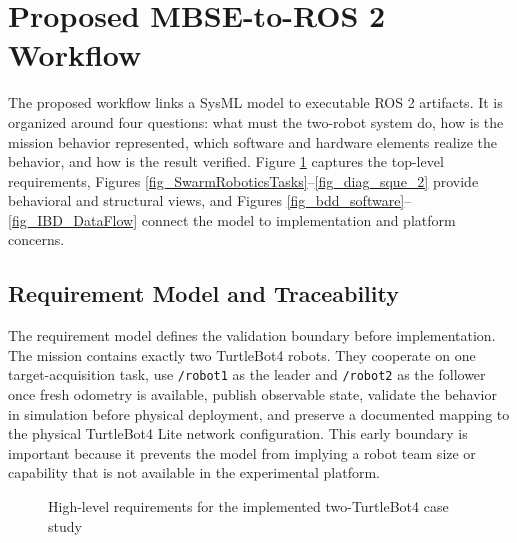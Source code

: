 \documentclass{ieeeaccess}
\begin{document}
\section{Proposed MBSE-to-ROS 2 Workflow}
The proposed workflow links a SysML model to executable ROS 2 artifacts. It is organized around four questions: what must the two-robot system do, how is the mission behavior represented, which software and hardware elements realize the behavior, and how is the result verified. Figure \ref{fig_diagram_req} captures the top-level requirements, Figures \ref{fig_SwarmRoboticsTasks}--\ref{fig_diag_sque_2} provide behavioral and structural views, and Figures \ref{fig_bdd_software}--\ref{fig_IBD_DataFlow} connect the model to implementation and platform concerns.

\subsection{Requirement Model and Traceability}
The requirement model defines the validation boundary before implementation. The mission contains exactly two TurtleBot4 robots. They cooperate on one target-acquisition task, use \texttt{/robot1} as the leader and \texttt{/robot2} as the follower once fresh odometry is available, publish observable state, validate the behavior in simulation before physical deployment, and preserve a documented mapping to the physical TurtleBot4 Lite network configuration. This early boundary is important because it prevents the model from implying a robot team size or capability that is not available in the experimental platform.

\begin{figure}[htbp]
  \centering
  \caption{High-level requirements for the implemented two-TurtleBot4 case study}
  \label{fig_diagram_req}
\end{figure}
\end{document}
